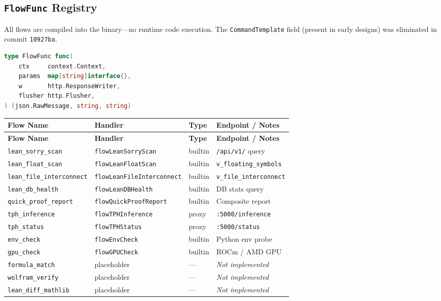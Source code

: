 \subsection{\texttt{FlowFunc} Registry}

All flows are compiled into the binary---no runtime code execution.  The
\texttt{CommandTemplate} field (present in early designs) was eliminated in
commit \texttt{10927ba}.

\begin{lstlisting}[language=Go, caption={FlowFunc type signature}]
type FlowFunc func(
    ctx     context.Context,
    params  map[string]interface{},
    w       http.ResponseWriter,
    flusher http.Flusher,
) (json.RawMessage, string, string)
\end{lstlisting}

\begin{longtable}{@{}lllp{3.2cm}@{}}
\toprule
\textbf{Flow Name} & \textbf{Handler} & \textbf{Type} & \textbf{Endpoint / Notes} \\
\midrule
\endfirsthead
\toprule
\textbf{Flow Name} & \textbf{Handler} & \textbf{Type} & \textbf{Endpoint / Notes} \\
\midrule
\endhead
\bottomrule
\endfoot
\texttt{lean\_sorry\_scan}        & \texttt{flowLeanSorryScan}        & builtin & \texttt{/api/v1/} query \\
\texttt{lean\_float\_scan}        & \texttt{flowLeanFloatScan}        & builtin & \texttt{v\_floating\_symbols} \\
\texttt{lean\_file\_interconnect} & \texttt{flowLeanFileInterconnect} & builtin & \texttt{v\_file\_interconnect} \\
\texttt{lean\_db\_health}         & \texttt{flowLeanDBHealth}         & builtin & DB stats query \\
\texttt{quick\_proof\_report}     & \texttt{flowQuickProofReport}     & builtin & Composite report \\
\texttt{tph\_inference}           & \texttt{flowTPHInference}         & proxy   & \texttt{:5000/inference} \\
\texttt{tph\_status}              & \texttt{flowTPHStatus}            & proxy   & \texttt{:5000/status} \\
\texttt{env\_check}               & \texttt{flowEnvCheck}             & builtin & Python env probe \\
\texttt{gpu\_check}               & \texttt{flowGPUCheck}             & builtin & ROCm / AMD GPU \\
\texttt{formula\_match}           & placeholder                      & ---     & \emph{Not implemented} \\
\texttt{wolfram\_verify}          & placeholder                      & ---     & \emph{Not implemented} \\
\texttt{lean\_diff\_mathlib}      & placeholder                      & ---     & \emph{Not implemented} \\
\end{longtable}

